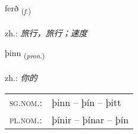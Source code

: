 \documentclass[frontgrid, backgrid]{flacards}\usepackage[]{graphicx}\usepackage[]{xcolor}
\begin{document}
\renewcommand{\flhead}{\vskip5pt \fboxsep=0pt {\small\bfseries\footnotesize Nafnorð | 名词}}
\renewcommand{\fcfoot}{\vskip5pt \fboxsep=0pt \hspace{2pt}{\small\bfseries\footnotesize 1K}}

\renewcommand{\blhead}{\vskip5pt {\small\bfseries\footnotesize Nafnorð | 名词 }}
\renewcommand{\bcfoot}{\vskip5pt \hspace{2pt}{\small\bfseries\footnotesize 1K}}


{ferð \small{\textsubscript{(\textit{f.})}} \\[1ex] %
\textphonetic{[fɛrð]} \\
zh.: \emph{旅行，旅行；速度} \\  [2ex]
\renewcommand*{\arraystretch}{0.8}
}

\renewcommand{\flhead}{\vskip5pt \fboxsep=0pt {\small\bfseries\footnotesize Fornafn | 代词}}
\renewcommand{\fcfoot}{\vskip5pt \fboxsep=0pt \hspace{2pt}{\small\bfseries\footnotesize 1K}}

\renewcommand{\blhead}{\vskip5pt {\small\bfseries\footnotesize Fornafn | 代词 }}
\renewcommand{\bcfoot}{\vskip5pt \hspace{2pt}{\small\bfseries\footnotesize 1K}}


{þinn \small{\textsubscript{(\textit{pron.})}} \\[1ex] %
\textphonetic{[θɪn]} \\
zh.: \emph{你的} \\  [2ex]
\renewcommand*{\arraystretch}{0.8}
\begin{tabular}{ll}
\textsc{sg.nom.}: & þinn  --  þín -- þitt \\ 
\textsc{pl.nom.}: & þínir -- þínar -- þín
\end{tabular}
}
\end{document}
